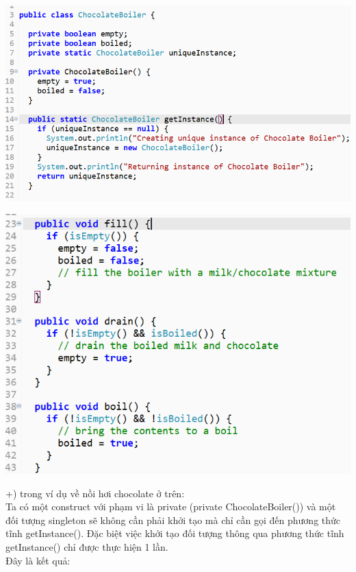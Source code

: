 \begin{multicols}{2}
\includegraphics[height=0.23\textheight]{GALLEYS/images/chapter1/images1s}

\includegraphics[height=0.25\textheight]{GALLEYS/images/chapter1/images1f}
\end{multicols}
+) trong ví dụ về nồi hơi chocolate ở trên:\\
Ta có một construct với phạm vi là private (private ChocolateBoiler()) và một đối tượng singleton sẽ không cần phải khởi tạo mà chỉ cần gọi đến phương thức tĩnh getInstance(). Đặc biệt việc khởi tạo đối tượng thông qua phương thức tĩnh getInstance() chỉ được thực hiện 1 lần.\\
Đây là kết quả:\\
